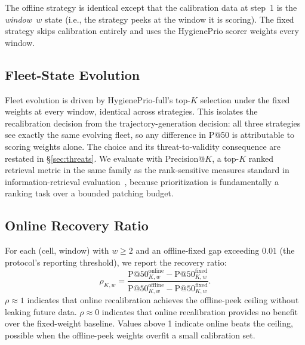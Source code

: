 The \textsf{offline} strategy is identical except that the calibration
data at step~1 is the \textit{window~$w$} state (i.e., the strategy
peeks at the window it is scoring). The \textsf{fixed} strategy skips
calibration entirely and uses the HygienePrio scorer weights every window.

\subsection{Fleet-State Evolution}

Fleet evolution is driven by HygienePrio-full's top-$K$ selection under
the \textsf{fixed} weights at every window, identical across strategies.
This isolates the recalibration decision from the trajectory-generation
decision: all three strategies see exactly the same evolving fleet, so
any difference in P@50 is attributable to scoring weights alone. The
choice and its threat-to-validity consequence are restated in
\S\ref{sec:threats}. We evaluate with Precision@$K$, a top-$K$ ranked
retrieval metric in the same family as the rank-sensitive measures
standard in information-retrieval evaluation~\cite{jarvelin2002cumulated},
because prioritization is fundamentally a ranking task over a bounded
patching budget.

\subsection{Online Recovery Ratio}

For each (cell, window) with $w \geq 2$ and an offline-fixed gap
exceeding $0.01$ (the protocol's reporting threshold), we report the
recovery ratio:
\begin{equation}
\rho_{K, w} = \frac{\text{P@50}^{\mathrm{online}}_{K, w} - \text{P@50}^{\mathrm{fixed}}_{K, w}}
 {\text{P@50}^{\mathrm{offline}}_{K, w} - \text{P@50}^{\mathrm{fixed}}_{K, w}}.
\end{equation}
$\rho \approx 1$ indicates that online recalibration achieves the
offline-peek ceiling without leaking future data. $\rho \approx 0$
indicates that online recalibration provides no benefit over the
fixed-weight baseline. Values above 1 indicate online beats the
ceiling, possible when the offline-peek weights overfit a small
calibration set.

